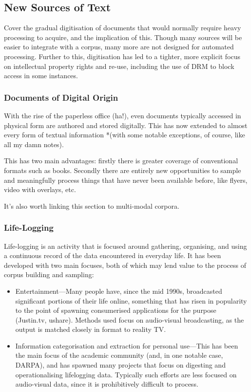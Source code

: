 

\subsection{New Sources of Text}
Cover the gradual digitisation of documents that would normally require heavy processing to acquire, and the implication of this.  Though many sources will be easier to integrate with a corpus, many more are not designed for automated processing.  Further to this, digitisation has led to a tighter, more explicit focus on intellectual property rights and re-use, including the use of DRM to block access in some instances.

\subsubsection{Documents of Digital Origin}
With the rise of the paperless office (ha!), even documents typically accessed in physical form are authored and stored digitally.  This has now extended to almost every form of textual information *(with some notable exceptions, of course, like all my damn notes).

This has two main advantages: firstly there is greater coverage of conventional formats such as books.  Secondly there are entirely new opportunities to sample and meaningfully process things that have never been available before, like flyers, video with overlays, etc.

It's also worth linking this section to multi-modal corpora.



\subsubsection{Life-Logging}
Life-logging is an activity that is focused around gathering, organising, and using a continuous record of the data encountered in everyday life.  It has been developed with two main focuses, both of which may lend value to the process of corpus building and sampling:

\begin{itemize}
    \item Entertainment---Many people have, since the mid 1990s, broadcasted significant portions of their life online, something that has risen in popularity to the point of spawning consumerised applications for the purpose (Justin.tv, ushare).  Methods used focus on audio-visual broadcasting, as the output is matched closely in format to reality TV.
    \item Information categorisation and extraction for personal use---This has been the main focus of the academic community (and, in one notable case, DARPA), and has spawned many projects that focus on digesting and operationalising lifelogging data.  Typically such efforts are less focused on audio-visual data, since it is prohibitively difficult to process.
\end{itemize}


